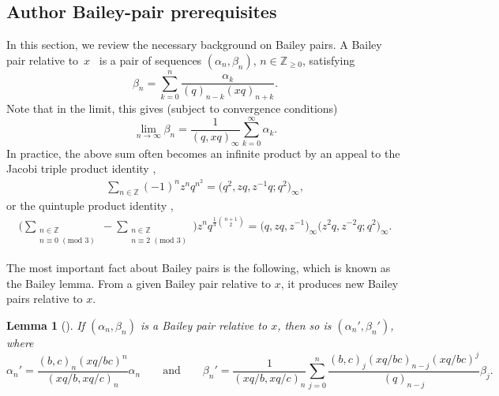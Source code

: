 \documentclass[11pt]{article}
\numberwithin{equation}{section}
\newtheorem{Lemma}[Theorem]{Lemma}
\numberwithin{equation}{section}
\newcommand{\ZZ}{\mathbb{Z}}
\begin{document}
\setcounter{section}{2}\setcounter{Theorem}{0}\setcounter{equation}{0}\subsection*{Author Bailey-pair prerequisites}
In this section, we review the necessary background on Bailey pairs. A Bailey pair relative to~$x$~\cite{Andmultiple} is a pair of sequences $(\alpha_n,\beta_n)$,
$n\in \ZZ_{\geq 0}$,
satisfying
\begin{equation*} %
	\beta_n = \sum_{k=0}^n \frac{\alpha_k}{(q)_{n-k}(xq)_{n+k}}.
\end{equation*}
Note that in the limit, this gives (subject to convergence conditions)
\begin{equation} \label{Baileylimit}
	\lim_{n \to \infty} \beta_n = \frac{1}{(q,xq)_{\infty}} \sum_{k=0}^{\infty} \alpha_k.
\end{equation}
In practice, the above sum often becomes an infinite product by an appeal to the Jacobi triple product identity \cite[equation~(2.2.10)]{AndBook},
\begin{align}
	\sum_{n\in\ZZ}(-1)^n z^nq^{n^2}=\bigl(q^2,zq,z^{-1}q;q^2\bigr)_\infty,
	\label{eqn:jtp}
\end{align}
or the quintuple product identity \cite{C-quint},
\begin{align}
	\Biggl(\sum_{\substack{n\in\ZZ\\ n\equiv 0\,\,(\mathrm{mod}\,\,3)}}
	-\sum_{\substack{n\in\ZZ\\ n\equiv 2\,\,(\mathrm{mod}\,\,3)}}
	\Biggr) z^nq^{\frac{1}{3}\binom{n+1}{2}}=\bigl(q,zq,z^{-1}\bigr)_\infty\bigl(z^2q,z^{-2}q;q^2\bigr)_\infty
	\label{eqn:qtp}.
\end{align}

The most important fact about Bailey pairs is the following, which is known as the Bailey lemma. From a given Bailey pair relative to $x$, it produces new Bailey pairs relative to $x$.

\begin{Lemma}[\cite{Andmultiple}] \label{Baileylemma}
	If $(\alpha_n,\beta_n)$ is a Bailey pair relative to $x$, then so is $(\alpha_n',\beta_n')$, where
	\begin{equation*} %
		\alpha_n' = \frac{(b,c)_n(xq/bc)^n}{(xq/b,xq/c)_n}\alpha_n
	\qquad
	\text{and}
	\qquad %
		\beta_n' = \frac{1}{(xq/b,xq/c)_n} \sum_{j=0}^n \frac{(b,c)_j(xq/bc)_{n-j} (xq/bc)^j}{(q)_{n-j}} \beta_j.
	\end{equation*}
\end{Lemma}
\end{document}

